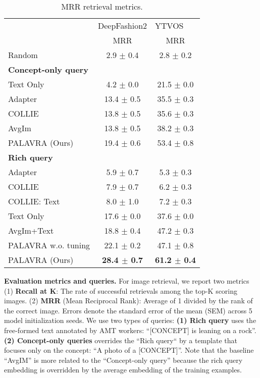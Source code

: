 \documentclass[runningheads]{llncs}
\newcommand{\concept}{[CONCEPT]}
\begin{document}
\begin{table}[t]
\centering
    \begin{tabular}{l|c|c}

    \toprule
        {} &    \multicolumn{1}{l|}{DeepFashion2}       &    \multicolumn{1}{l}{YTVOS} \\
    {} &         MRR &         MRR \\
    \midrule
    Random         &   2.9 $\pm$ 0.4 &   2.8 $\pm$ 0.2 \\
    \toprule
    {\textbf{Concept-only query}} &&\\
    Text Only    &  4.2 $\pm$ 0.0  &  21.5 $\pm$ 0.0 \\
    Adapter        &  13.4 $\pm$ 0.5 &  35.5 $\pm$ 0.3 \\
    COLLIE         &  13.8 $\pm$ 0.5 &  35.6 $\pm$ 0.3 \\
    AvgIm          &  13.8 $\pm$ 0.5 &  38.2 $\pm$ 0.3 \\
    PALAVRA (Ours) &  19.4 $\pm$ 0.6 &  53.4 $\pm$ 0.8 \\    \toprule
    {\textbf{Rich query}}&&\\
    Adapter        &   5.9 $\pm$ 0.7 &   5.3 $\pm$ 0.3 \\
    COLLIE         &   7.9 $\pm$ 0.7 &   6.2 $\pm$ 0.3 \\
    COLLIE: Text    &  8.0 $\pm$ 1.0 &   7.2 $\pm$ 0.3 \\
    Text Only    &  17.6 $\pm$ 0.0 &  37.6 $\pm$ 0.0 \\
    AvgIm+Text     &  18.8 $\pm$ 0.4 &  47.2 $\pm$ 0.3 \\
    \midrule
    PALAVRA w.o. tuning   &  22.1 $\pm$ 0.2 &  47.1 $\pm$ 0.8 \\
    PALAVRA (Ours) &  \textbf{28.4 $\pm$ 0.7} &  \textbf{61.2 $\pm$ 0.4} \\
    \bottomrule
    
    \end{tabular}

    \caption{MRR retrieval metrics.}
    \label{table_main_retrieval}
\end{table}

\noindent\textbf{Evaluation metrics and queries.} For image retrieval, we report two metrics (1) \textbf{Recall at K}: The rate of successful retrievals among the top-K scoring images. (2) \textbf{MRR} (Mean Reciprocal Rank): Average of 1 divided by the rank of the correct image. Errors denote the standard error of the mean (SEM) across 5 model initialization seeds.
We use two types of queries: \textbf{(1) Rich query} uses the free-formed text annotated by AMT workers: ``\concept{} is leaning on a rock''. \textbf{(2) Concept-only queries} overrides the ``Rich query`` by a template that focuses only on the concept: ``A photo of a \concept{}''. Note that the baseline ``AvgIM''  is more related to the ``Concept-only query'' because the rich query embedding is overridden by the average embedding of the training examples.
\end{document}
